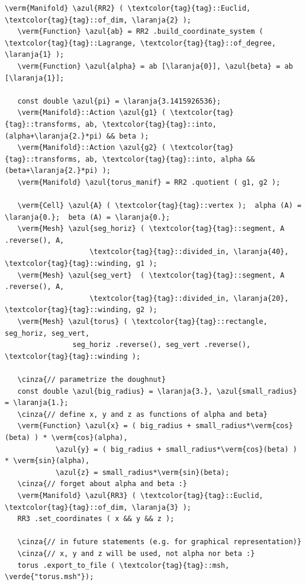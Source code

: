 \begin{Verbatim}[commandchars=\\\{\},formatcom=\small\tt,frame=single,
   label=parag-\ref{\numb section 7.\numb parag 5}.cpp,rulecolor=\color{moldura},
   baselinestretch=0.94,framesep=2mm                                            ]
   \verm{Manifold} \azul{RR2} ( \textcolor{tag}{tag}::Euclid, \textcolor{tag}{tag}::of_dim, \laranja{2} );
   \verm{Function} \azul{ab} = RR2 .build_coordinate_system ( \textcolor{tag}{tag}::Lagrange, \textcolor{tag}{tag}::of_degree, \laranja{1} );
   \verm{Function} \azul{alpha} = ab [\laranja{0}], \azul{beta} = ab [\laranja{1}];

   const double \azul{pi} = \laranja{3.1415926536};
   \verm{Manifold}::Action \azul{g1} ( \textcolor{tag}{tag}::transforms, ab, \textcolor{tag}{tag}::into, (alpha+\laranja{2.}*pi) && beta );
   \verm{Manifold}::Action \azul{g2} ( \textcolor{tag}{tag}::transforms, ab, \textcolor{tag}{tag}::into, alpha && (beta+\laranja{2.}*pi) );
   \verm{Manifold} \azul{torus_manif} = RR2 .quotient ( g1, g2 );

   \verm{Cell} \azul{A} ( \textcolor{tag}{tag}::vertex );  alpha (A) = \laranja{0.};  beta (A) = \laranja{0.};
   \verm{Mesh} \azul{seg_horiz} ( \textcolor{tag}{tag}::segment, A .reverse(), A,
                    \textcolor{tag}{tag}::divided_in, \laranja{40}, \textcolor{tag}{tag}::winding, g1 );
   \verm{Mesh} \azul{seg_vert}  ( \textcolor{tag}{tag}::segment, A .reverse(), A,
                    \textcolor{tag}{tag}::divided_in, \laranja{20}, \textcolor{tag}{tag}::winding, g2 );
   \verm{Mesh} \azul{torus} ( \textcolor{tag}{tag}::rectangle, seg_horiz, seg_vert,
                seg_horiz .reverse(), seg_vert .reverse(), \textcolor{tag}{tag}::winding );

   \cinza{// parametrize the doughnut}
   const double \azul{big_radius} = \laranja{3.}, \azul{small_radius} = \laranja{1.};
   \cinza{// define x, y and z as functions of alpha and beta}
   \verm{Function} \azul{x} = ( big_radius + small_radius*\verm{cos}(beta) ) * \verm{cos}(alpha),
            \azul{y} = ( big_radius + small_radius*\verm{cos}(beta) ) * \verm{sin}(alpha),
            \azul{z} = small_radius*\verm{sin}(beta);
   \cinza{// forget about alpha and beta :}
   \verm{Manifold} \azul{RR3} ( \textcolor{tag}{tag}::Euclid, \textcolor{tag}{tag}::of_dim, \laranja{3} );
   RR3 .set_coordinates ( x && y && z );

   \cinza{// in future statements (e.g. for graphical representation)}
   \cinza{// x, y and z will be used, not alpha nor beta :}
   torus .export_to_file ( \textcolor{tag}{tag}::msh, \verde{"torus.msh"});
\end{Verbatim}


